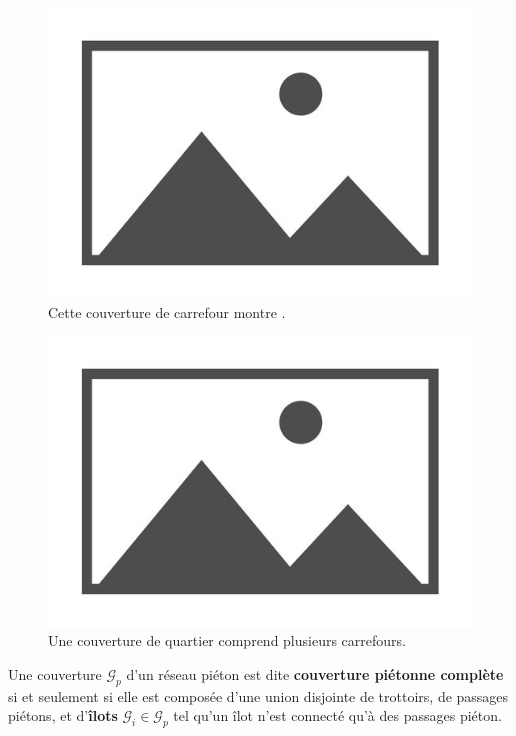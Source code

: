 \begin{figure}
    \centering
    \includegraphics{images/placeholder.jpg}
    \caption{Cette couverture de carrefour montre \todo{}.}
    \label{fig:mod_ex_couverture_routiere_carrefour}
\end{figure}

\begin{figure}
    \centering
    \includegraphics{images/placeholder.jpg}
    \caption{Une couverture de quartier comprend plusieurs carrefours.}
    \label{fig:mod_ex_couverture_routiere_quartier}
\end{figure}

\begin{definition}
    Une couverture $\mathcal{G}_p$ d'un réseau piéton est dite \textbf{couverture piétonne complète} si et seulement si elle est composée d'une union disjointe de trottoirs, de passages piétons, et d'\textbf{îlots} $\mathcal{G}_i \in \mathcal{G}_p$ tel qu'un îlot n'est connecté qu'à des passages piéton.
\end{definition}

